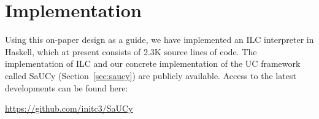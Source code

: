 \section{Implementation}
\label{sec:implementation}

Using this on-paper design as a guide, we have implemented an ILC interpreter in
Haskell, which at present consists of 2.3K source lines of code. The
implementation of ILC and our concrete implementation of the UC framework called
SaUCy (Section~\ref{sec:saucy}) are publicly available. Access to the latest
developments can be found here:\\
\centerline{\url{https://github.com/initc3/SaUCy}}

%
%
%
%
